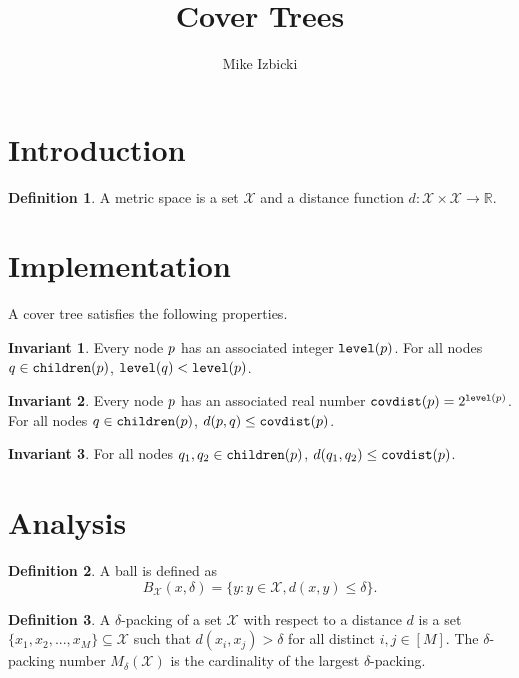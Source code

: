 \documentclass{article}
\title{Cover Trees}
\author{Mike Izbicki}
\theoremstyle{definition}
\newtheorem{invariant}{Invariant}
\newtheorem{defn}{Definition}
\newcommand{\p}{\ensuremath p}
\newcommand{\q}{\ensuremath q}
\newcommand{\set}{\mathcal}
\newcommand{\distf}{d}
\newcommand{\dist}[2]{\distf({#1},{#2})}
\newcommand{\level}{\text{\ttfamily level}}
\newcommand{\children}{\text{\ttfamily children}}
\newcommand{\covdist}{\text{\ttfamily covdist}}
\begin{document}
\maketitle

\section{Introduction}

\begin{defn}
A metric space is a set $\set X$ and a distance function $\distf : \set X \times \set X \to \mathbb R$.
\end{defn}

\section{Implementation}
A cover tree satisfies the following properties.

\begin{invariant}
Every node $\p$ has an associated integer $\level(\p)$.
For all nodes $\q\in\children(\p)$, $\level(\q) < \level(\p)$.
\end{invariant}

\begin{invariant}
Every node $\p$ has an associated real number $\covdist(\p)=2^{\level(\p)}$.
For all nodes $\q\in\children(\p)$, $\dist \p \q \le \covdist(\p)$.
\end{invariant}

\begin{invariant}
For all nodes $\q_1,\q_2\in\children(\p)$, $\dist {\q_1} {\q_2} \le \covdist(\p)$.
\end{invariant}

\section{Analysis}

\begin{defn}
A ball is defined as
\begin{equation}
B_\set X(x,\delta) = \{ y : y\in\set X, \dist{x}{y} \le \delta \}.
\end{equation}
\end{defn}

\begin{defn}
A $\delta$-packing of a set $\set X$ with respect to a distance $\distf$ is a set $\{x_1,x_2,...,x_M\} \subseteq \set X$ such that $\dist{x_i}{x_j} > \delta$ for all distinct $i,j\in[M]$.
The $\delta$-packing number $M_\delta (\set X)$ is the cardinality of the largest $\delta$-packing.
\end{defn}
\end{document}
